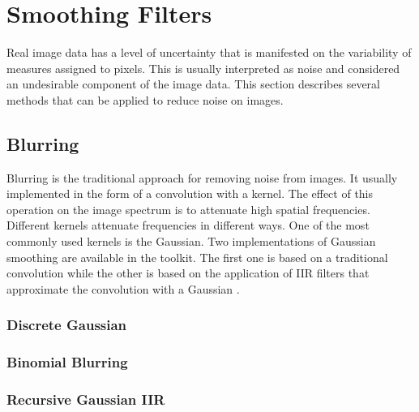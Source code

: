 




\section{Smoothing Filters}
\label{sec:SmoothingFilters}

Real image data has a level of uncertainty that is manifested on the
variability of measures assigned to pixels. This is usually interpreted as
noise and considered an undesirable component of the image data. This section
describes several methods that can be applied to reduce noise on images.

\subsection{Blurring}
\label{sec:BlurringFilters}

Blurring is the traditional approach for removing noise from images. It 
usually implemented in the form of a convolution with a kernel. The effect of
this operation on the image spectrum is to attenuate high spatial frequencies.
Different kernels attenuate frequencies in different ways. One of the most
commonly used kernels is the Gaussian. Two implementations of Gaussian
smoothing are available in the toolkit. The first one is based on a traditional
convolution while the other is based on the application of IIR filters that
approximate the convolution with a Gaussian \cite{Deriche1990,Deriche1993}. 

\subsubsection{Discrete Gaussian}
\label{sec:DiscreteGaussianImageFilter}




\subsubsection{Binomial Blurring}
\label{sec:BinomialBlurImageFilter}



\subsubsection{Recursive Gaussian IIR}
\label{sec:RecursiveGaussianImageFilter}

